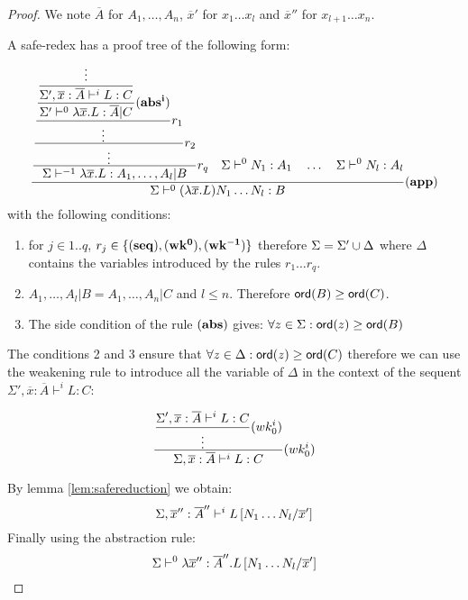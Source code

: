 \begin{proof}
We note $\overline{A}$ for $A_1, \ldots , A_n$, $\overline{x}'$ for
$x_1 \ldots x_l$ and $\overline{x}''$ for $x_{l+1} \ldots x_n$.

A safe-redex has a proof tree of the following form:
$$
   \frac{\displaystyle 
        \frac{\displaystyle 
            \frac{\displaystyle 
                \frac{\displaystyle 
                    \frac{\displaystyle  \frac{\displaystyle \vdots}{\Sigma',\overline{x}:\overline{A}\vdash^i L:C  }
                        }{\Sigma' \vdash^0 \lambda \overline{x} . L : \overline{A}|C} \mathbf{(abs^i)}
                }{\vdots} r_1
            }{\vdots} r_2
            }{ \Sigma \vdash^{-1} \lambda \overline{x} . L : A_1, \ldots , A_l|B} r_q
            \quad
            \Sigma \vdash^0 N_1 : A_1
            \quad \ldots \quad \Sigma \vdash^0 N_l : A_l
    }{
       \Sigma \vdash^0 (\lambda \overline{x} . L) N_1 \ldots N_l : B
    } (\mathbf{app})
$$
with the following conditions:
\begin{enumerate}
\item for $j\in 1..q$, $r_j \in \{ \mathbf{(seq)}, \mathbf{(wk^0)}, \mathbf{(wk^{-1})} \}$ therefore
$\Sigma = \Sigma' \cup \Delta$ where $\Delta$ contains the
variables introduced by the rules $r_1 \ldots r_q$.

\item $A_1, \ldots , A_l|B = A_1, \ldots , A_n|C$ and $l\leq n$. Therefore
${\sf ord}(B) \geq {\sf ord}(C)$.
\item The side condition of the rule $\mathbf{(abs)}$ gives: $\forall z \in \Sigma : {\sf ord}(z) \geq {\sf ord}(B)$
\end{enumerate}


The conditions 2 and 3 ensure that $\forall z \in \Delta : {\sf ord}(z)
\geq {\sf ord}(C)$ therefore we can use the weakening rule to introduce
all the variable of $\Delta$ in the context of the sequent
$\Sigma',\overline{x}:\overline{A}\vdash^i L:C$:

$$\frac{\displaystyle \frac{\displaystyle  \Sigma',\overline{x}:\overline{A}\vdash^i L:C  }{\vdots} (wk^i_0)}{\Sigma,\overline{x}:\overline{A}\vdash^i L:C} (wk^i_0)
$$

By lemma \ref{lem:safereduction} we obtain:
$$ \Sigma, \overline{x}'':\overline{A}'' \vdash^i L\left[ N_1 \ldots N_l/\overline{x}' \right]$$
Finally using the abstraction rule:
$$ \Sigma \vdash^0 \lambda \overline{x}'':\overline{A}'' . L\left[ N_1 \ldots N_l/\overline{x}' \right]$$
\end{proof}



